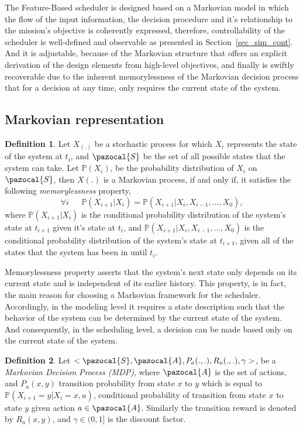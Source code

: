\documentclass[12pt]{aastex62}
\theoremstyle{definition}
\newtheorem{defn}{Definition}
\begin{document}
The Feature-Based scheduler is designed based on a Markovian model in which the flow of the input information, the decision procedure and it's relationship to the mission's objective is coherently expressed, therefore, controllability of the scheduler is well-defined and observable as presented in Section~\ref{sec_sim_cont}. And it is adjustable, because of the Markovian structure that offers an explicit derivation of the design elements from high-level objectives, and finally is swiftly recoverable due to the inherent memorylessness of the Markovian decision process that for a decision at any time, only requires the current state of the system.

\subsection{Markovian representation}\label{sec_Markov}

\begin{defn}
Let $X_{(.)}$ be a stochastic process for which $X_i$ represents the state of the system at $t_i$, and $\pazocal{S}$ be the set of all possible states that the system can take. Let $\mathbb{P}(X_i)$, be the probability distribution of $X_i$ on $\pazocal{S}$, then $X(.)$ is a Markovian process, if and only if, it satisfies the following \textit{memorylessness} property,
\begin{equation*}
\forall i ~~~~~~~\mathbb{P}(X_{{i+1}} | X_{i}) = \mathbb{P}(X_{{i+1}} | X_{i}, X_{{i-1}},\dots, X_{0}),
\end{equation*}
where $\mathbb{P}(X_{{i+1}} | X_{i})$ is the conditional probability distribution of the system's state at $t_{i+1}$ given it's state at $t_i$, and $\mathbb{P}(X_{{i+1}} | X_{i}, X_{{i-1}},\dots, X_{0})$ is the conditional probability distribution of the system's state at $t_{i+1}$, given all of the states that the system has been in until $t_i$.
\end{defn}

Memorylessness property asserts that the system's next state only depends on its current state and is independent of its earlier history. This property, is in fact, the main reason for choosing a Markovian framework for the scheduler. Accordingly, in the modeling level it requires a state description such that the behavior of the system can be determined by the current state of the system. And consequently, in the scheduling level, a decision can be made based only on the current state of the system.

\begin{defn}
Let $<\pazocal{S},\pazocal{A}, P_a(.,.), R_a(.,.), \gamma>$, be a \textit{Markovian Decision Process (MDP)}, where $\pazocal{A}$ is the set of actions, and $P_a(x, y)$ transition probability from state $x$ to $y$ which is equal to $\mathbb{P}(X_{i+1}=y | X_i=x, a)$, conditional probability of transition from state $x$ to state $y$ given action $a \in  \pazocal{A}$. Similarly the transition reward is denoted by $R_a(x,y)$, and $\gamma \in (0,1]$ is the discount factor.
\end{defn}
\end{document}
